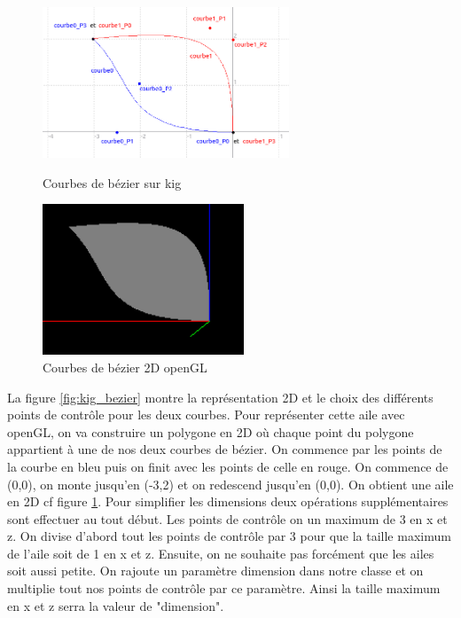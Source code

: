 \documentclass{article}
\begin{document}
\begin{figure}[!htb]
	\begin{minipage}{0.5\textwidth}
    	\centering
    	\includegraphics[height=4.5cm]{./assets/kig_bezier.png}
    	\caption{Courbes de bézier sur kig}
    	\label{fig:kig_bezier}
	\end{minipage}
	\hfill
	\begin{minipage}{0.5\textwidth}
    	\centering
    	\includegraphics[height=4.5cm]{./assets/2D_bezier.png}
    	\caption{Courbes de bézier 2D openGL}
    	\label{fig:2D_bezier}
	\end{minipage}
\end{figure}

La figure \ref{fig:kig_bezier} montre la représentation 2D et le choix des différents points de contrôle pour les deux courbes. Pour représenter cette aile avec openGL, on va construire un polygone en 2D où chaque point du polygone appartient à une de nos deux courbes de bézier. On commence par les points de la courbe en bleu puis on finit avec les points de celle en rouge. On commence de (0,0), on monte jusqu'en (-3,2) et on redescend jusqu'en (0,0). On obtient une aile en 2D cf figure \ref{fig:2D_bezier}. 
\newline
\newline
Pour simplifier les dimensions deux opérations supplémentaires sont effectuer au tout début. Les points de contrôle on un maximum de 3 en x et z. On divise d'abord tout les points de contrôle par 3 pour que la taille maximum de l'aile soit de 1 en x et z. Ensuite, on ne souhaite pas forcément que les ailes soit aussi petite. On rajoute un paramètre dimension dans notre classe et on multiplie tout nos points de contrôle par ce paramètre. Ainsi la taille maximum en x et z serra la valeur de "dimension".
\end{document}
